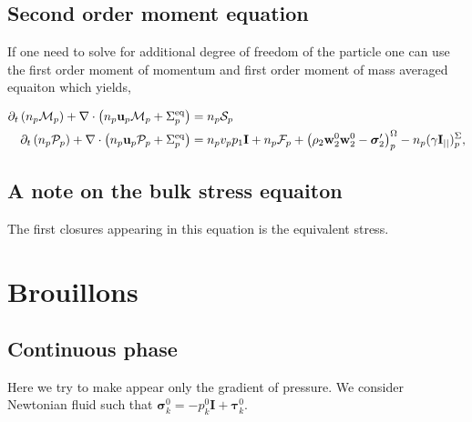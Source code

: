 \subsection*{Second order moment equation}

If one need to solve for additional degree of freedom of the particle one can use the first order moment of momentum and first order moment of mass averaged equaiton which yields, 

\begin{align}
    \partial_t \left(n_p \mathcal{M}_p\right)
    + \mathbf{\nabla}\cdot \left(
        n_p \textbf{u}_p \mathcal{M}_p
    + \Sigma_p^\text{eq}
    \right)
    &=
    n_p \mathcal{S}_p\\
    \partial_t \left(n_p \mathcal{P}_p\right)
    + \mathbf{\nabla}\cdot \left(
        n_p \textbf{u}_p \mathcal{P}_p
    + \Sigma_p^\text{eq}
    \right)
    &=
    n_p v_p p_1 \textbf{I}
    + n_p \mathcal{F}_p
    + \left(
        \rho_2 \textbf{w}_2^0  \textbf{w}_2^0 
        - \bm{\sigma}_2'
    \right)^\Omega_p
    - n_p (\gamma \textbf{I}_{||})^\Sigma_p,
\end{align}

\subsection{A note on the bulk stress equaiton}
The first closures appearing in this equation is the equivalent stress. 
\section*{Brouillons }

\subsection{Continuous phase}
Here we try to make appear only the gradient of pressure. 
We consider Newtonian fluid such that $\bm{\sigma}_k^0 = -p^0_k \textbf{I} + \bm{\tau}_k^0$. 

